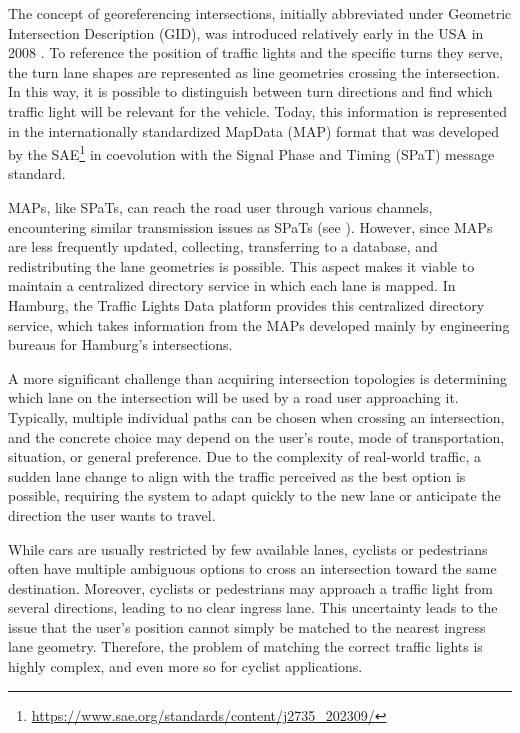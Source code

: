 The concept of georeferencing intersections, initially abbreviated under Geometric Intersection Description (GID), was introduced relatively early in the USA in 2008 \cite{cicas-v}. To reference the position of traffic lights and the specific turns they serve, the turn lane shapes are represented as line geometries crossing the intersection. In this way, it is possible to distinguish between turn directions and find which traffic light will be relevant for the vehicle. Today, this information is represented in the internationally standardized MapData (MAP) format that was developed by the SAE\footnote{\url{https://www.sae.org/standards/content/j2735_202309/}} in coevolution with the Signal Phase and Timing (SPaT) message standard.

MAPs, like SPaTs, can reach the road user through various channels, encountering similar transmission issues as SPaTs (see ). However, since MAPs are less frequently updated, collecting, transferring to a database, and redistributing the lane geometries is possible. This aspect makes it viable to maintain a centralized directory service in which each lane is mapped. In Hamburg, the Traffic Lights Data platform provides this centralized directory service, which takes information from the MAPs developed mainly by engineering bureaus for Hamburg's intersections.

A more significant challenge than acquiring intersection topologies is determining which lane on the intersection will be used by a road user approaching it. Typically, multiple individual paths can be chosen when crossing an intersection, and the concrete choice may depend on the user's route, mode of transportation, situation, or general preference. Due to the complexity of real-world traffic, a sudden lane change to align with the traffic perceived as the best option is possible, requiring the system to adapt quickly to the new lane or anticipate the direction the user wants to travel. 

While cars are usually restricted by few available lanes, cyclists or pedestrians often have multiple ambiguous options to cross an intersection toward the same destination. Moreover, cyclists or pedestrians may approach a traffic light from several directions, leading to no clear ingress lane. This uncertainty leads to the issue that the user's position cannot simply be matched to the nearest ingress lane geometry. Therefore, the problem of matching the correct traffic lights is highly complex, and even more so for cyclist applications.

